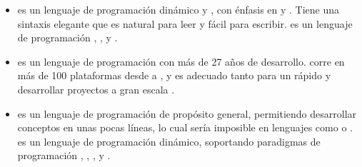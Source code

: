 \begin{itemize}
			\item
				\textbf{\rubyNAME} es un lenguaje de programación dinámico y \openSourcePC, con énfasis en \simplicity y \productivity. Tiene una sintaxis elegante que es natural para leer y fácil para escribir. \rubyNAME es un lenguaje de programación \objectOrientedPL, \imperativePL, y \functionalPL \cite{online_ruby_org}.

			\item
				\textbf{\perlNAME} es un lenguaje de programación con más de 27 años de desarrollo.  corre en más de 100 plataformas desde \portablesAS a \mainframesAS, y es adecuado tanto para un rápido \prototypingCPT y desarrollar proyectos a gran escala \cite{online_org_perl_about}.

			\item
				\textbf{\pythonNAME} es un lenguaje de programación \highLevelCPT de propósito general, permitiendo desarrollar conceptos en unas pocas líneas, lo cual sería imposible en lenguajes como \javaNAME o \cPlusPlus. \pythonNAME es un lenguaje de programación \multiParadigmPL dinámico, soportando paradigmas de programación \objectOrientedPL, \imperativePL, \functionalPL, \proceduralPL y  \cite{online_org_docs_python_functional}.
		\end{itemize}

